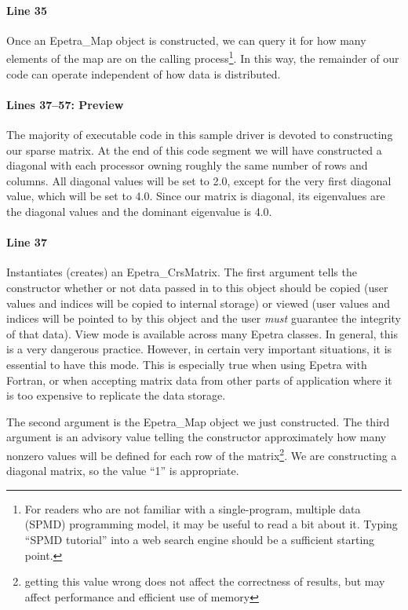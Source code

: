 \documentclass[12pt,relax]{EpetraUserGuide}
\newcommand{\map}{Epetra\_Map}
\newcommand{\crsmatrix}{Epetra\_CrsMatrix}
\begin{document}
\paragraph{Line 35}
Once an \map{} object is constructed, we can query it for how many
elements of the map are on the calling process\footnote{For readers
who are not familiar with a single-program, multiple data (SPMD)
programming model, it may be useful to read a bit about it.  Typing
``SPMD tutorial'' into a web search engine should be a sufficient
starting point.}.  In this way, the remainder of our code can operate
independent of how data is distributed.
\paragraph{Lines 37--57: Preview}
The majority of executable code in this sample driver is devoted to
constructing our sparse matrix.  At the end of this code segment we
will have constructed a diagonal with each processor owning roughly
the same number of rows and columns.  All diagonal values will be set
to 2.0, except for the very first diagonal value, which will be set to
4.0.  Since our matrix is diagonal, its eigenvalues are the diagonal
values and the dominant eigenvalue is 4.0.
\paragraph{Line 37}
Instantiates (creates) an \crsmatrix{}.  The first argument tells the
constructor whether or not data passed in to this object should be
copied (user values and indices will be copied to internal storage) or
viewed (user values and indices will be pointed to by this object and
the user {\it must} guarantee the integrity of that data).  View mode
is available across many Epetra classes.  In general, this is a very
dangerous practice.  However, in certain very important situations, it
is essential to have this mode.  This is especially true when using
Epetra with Fortran, or when accepting matrix data from other parts of
application where it is too expensive to replicate the data storage.

The second argument is the \map{} object we just constructed.  The
third argument is an advisory value telling the constructor
approximately how many nonzero values will be defined for each row of
the matrix\footnote{getting this value wrong does not
affect the correctness of results, but may affect performance and
efficient use of memory}.  We are constructing a diagonal matrix, so the value ``1''
is appropriate.
\end{document}
